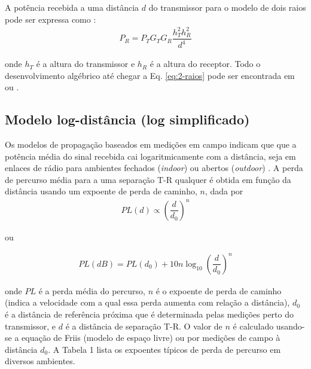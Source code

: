 A potência recebida a uma distância $d$ do transmissor para o modelo de dois raios pode ser expressa como \cite{rappaport2009}:
\begin{equation}
	\begin{aligned}
	\label{eq:2-raios}
		P_R = P_TG_TG_R\dfrac{h^2_Th^2_R}{d^4}
	\end{aligned}
\end{equation}

\noindent onde $h_T$ é a altura do transmissor e $h_R$ é a altura do receptor. Todo o desenvolvimento algébrico até chegar a Eq. \eqref{eq:2-raios} pode ser encontrada em  ou .

\subsection{Modelo log-distância (log simplificado)}
\label{sub:log-distancia}

Os modelos de propagação baseados em medições em campo indicam que que a potência média do sinal recebida cai logaritmicamente com a distância, seja em enlaces de rádio para ambientes fechados (\textit{indoor}) ou abertos (\textit{outdoor}) \cite{rappaport2009}. A perda de percurso média para a uma separação T-R qualquer é obtida em função da distância usando um expoente de perda de caminho, $n$, dada por
\begin{equation}
	\begin{aligned}
	\label{eq:log-distancia}
		PL(d) \propto \left(\dfrac{d}{d_0}\right)^n
	\end{aligned}
\end{equation}

\noindent ou

\begin{equation}
	\begin{aligned}
	\label{eq:log-distancia-2}
		PL(dB) = PL(d_0) + 10n\log_{10}\left(\dfrac{d}{d_0}\right)^n
	\end{aligned}
\end{equation}

\noindent onde $PL$ é a perda média do percurso, $n$ é o expoente de perda de caminho (indica a velocidade com a qual essa perda aumenta com relação a distância), $d_0$ é a distância de referência próxima que é determinada pelas medições perto do transmissor, e $d$ é a distância de separação T-R. O valor de $n$ é calculado usando-se a equação de Friis (modelo de espaço livre) ou por medições de campo à distância $d_0$. A Tabela 1 lista os expoentes típicos de perda de percurso em diversos ambientes.

